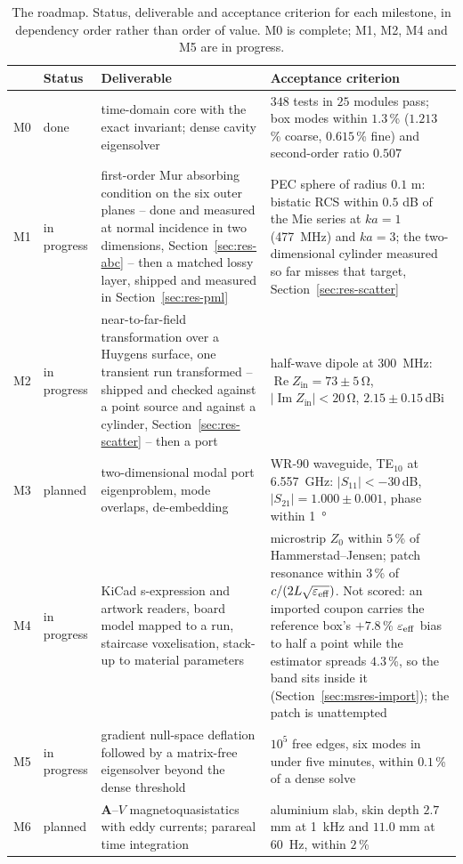 \begin{table}[H]
  \centering
  \caption{The roadmap. Status, deliverable and acceptance criterion for each milestone, in dependency order
  rather than order of value. M0 is complete; M1, M2, M4 and M5 are in progress.}
  \label{tab:milestones}
  \begin{tabular}{@{}lp{1.8cm}p{5.6cm}p{5.6cm}@{}}
    \toprule
    & Status & Deliverable & Acceptance criterion \\
    \midrule
    M0 & done & time-domain core with the exact invariant; dense cavity eigensolver & $348$ tests in $25$
    modules pass; box modes within $1.3$\,\% ($1.213$\,\% coarse, $0.615$\,\% fine) and second-order ratio $0.507$ \\
    M1 & in progress & first-order Mur absorbing condition on the six outer planes -- done and measured at normal
    incidence in two dimensions, Section~\ref{sec:res-abc} -- then a matched lossy layer, shipped and measured in
    Section~\ref{sec:res-pml} & PEC sphere of radius $0.1$ m: bistatic RCS within $0.5$ dB of the Mie series at
    $ka=1$ (\SI{477}{\mega\hertz}) and $ka=3$; the two-dimensional cylinder measured so far misses that target,
    Section~\ref{sec:res-scatter} \\
    M2 & in progress & near-to-far-field transformation over a Huygens surface, one transient run transformed --
    shipped and checked against a point source and against a cylinder, Section~\ref{sec:res-scatter} -- then a port &
    half-wave dipole at \SI{300}{\mega\hertz}: $\operatorname{Re}Z_{\mathrm{in}}=73\pm5$\,\si{\ohm},
    $|\operatorname{Im}Z_{\mathrm{in}}|<20$\,\si{\ohm}, $2.15\pm0.15$\,dBi \\
    M3 & planned & two-dimensional modal port eigenproblem, mode overlaps, de-embedding & WR-90 waveguide,
    TE$_{10}$ at \SI{6.557}{\giga\hertz}: $|S_{11}|<-30$\,dB, $|S_{21}|=1.000\pm0.001$, phase within
    \SI{1}{\degree} \\
    M4 & in progress & KiCad s-expression and artwork readers, board model mapped to a run, staircase
    voxelisation, stack-up to material parameters & microstrip $Z_0$ within $5$\,\% of Hammerstad--Jensen;
    patch resonance within $3$\,\% of $c/(2L\sqrt{\varepsilon_{\mathrm{eff}}})$. Not scored: an imported coupon
    carries the reference box's $+7.8$\,\% $\varepsilon_{\mathrm{eff}}$ bias to half a point while the estimator
    spreads $4.3$\,\%, so the band sits inside it (Section~\ref{sec:msres-import}); the patch is unattempted \\
    M5 & in progress & gradient null-space deflation followed by a matrix-free eigensolver beyond the dense
    threshold & $10^5$ free edges, six modes in under five minutes, within $0.1$\,\% of a dense solve \\
    M6 & planned & $\mathbf{A}$--$V$ magnetoquasistatics with eddy currents; parareal time integration & aluminium
    slab, skin depth $2.7$ mm at \SI{1}{\kilo\hertz} and $11.0$ mm at \SI{60}{\hertz}, within $2$\,\% \\
    \bottomrule
  \end{tabular}
\end{table}

